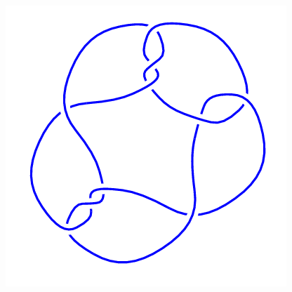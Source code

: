 \begin{figure}[H]
\begin{minipage}[b]{.18\linewidth}
    \end{minipage}
    \begin{minipage}[b]{.18\linewidth}
        \centering
        \includegraphics[width=\linewidth]{../data/10_76.png}
    \end{minipage}
\end{figure}
